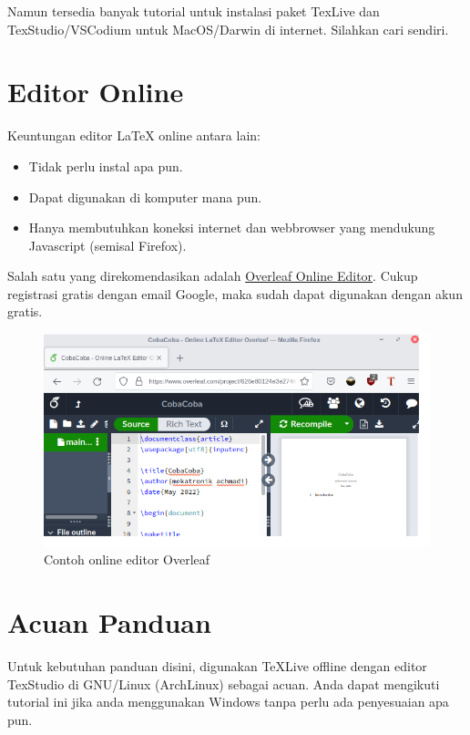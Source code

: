 \documentclass{book} %
\begin{document}
	Namun tersedia banyak tutorial untuk instalasi paket TexLive dan TexStudio/VSCodium untuk MacOS/Darwin di internet.
	Silahkan cari sendiri.

	\section{Editor Online}

	Keuntungan editor \LaTeX{} online antara lain:
	\begin{itemize}
		\item Tidak perlu instal apa pun.
		\item Dapat digunakan di komputer mana pun.
		\item Hanya membutuhkan koneksi internet dan webbrowser yang mendukung Javascript (semisal Firefox).
	\end{itemize}

	Salah satu yang direkomendasikan adalah \href{https://www.overleaf.com/project}{Overleaf Online Editor}.
	Cukup registrasi gratis dengan email Google, maka sudah dapat digunakan dengan akun gratis.

	\begin{figure}[!ht]
		\centering
		\includegraphics[width=400pt]{images/overleaf}
		\caption{Contoh online editor Overleaf}
	\end{figure}

	\section{Acuan Panduan}

	Untuk kebutuhan panduan disini, digunakan TeXLive offline dengan editor TexStudio di GNU/Linux (ArchLinux) sebagai acuan.
	Anda dapat mengikuti tutorial ini jika anda menggunakan Windows tanpa perlu ada penyesuaian apa pun.
\end{document}
